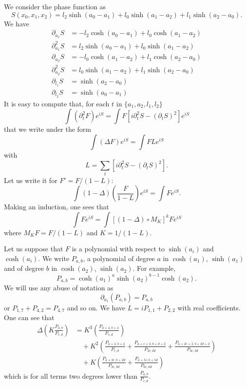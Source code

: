 We consider the phase function as
\begin{equation}
S(x_0,x_1,x_2)=l_2\sinh(a_0-a_1)+l_0\sinh(a_1-a_2)+l_1\sinh(a_2-a_0).
\end{equation}
We have
\begin{subequations}
\begin{align}
\partial_{a_1}S&=-l_2\cosh(a_0-a_1)+l_0\cosh(a_1-a_2)\\
\partial^2_{a_1}S&=l_2\sinh(a_0-a_1)+l_0\sinh(a_1-a_2)\\
\partial_{a_2}S&=-l_0\cosh(a_1-a_2)+l_1\cosh(a_2-a_0)\\
\partial^2_{a_2}S&=l_0\sinh(a_1-a_2)+l_1\sinh(a_2-a_0)\\
\partial_{l_1}S&=\sinh(a_2-a_0)\\
\partial_{l_2}S&=\sinh(a_0-a_1)
\end{align}
\end{subequations}
It is easy to compute that, for each $t$ in $\{a_1, a_2, l_1, l_2\}$
\[ 
  \int (\partial_t^2 F)e^{iS}=\int F[i\partial_t^2S-(\partial_tS)^2]e^{iS}
\]
that we write under the form
\begin{equation}
\int (\Delta F)e^{iS}=\int FLe^{iS}
\end{equation}
with
\[ 
  L=\sum_t [i\partial^2_t S-(\partial_t S)^2].
\]
Let us write it for $F'=F/(1-L)$:
\[ 
  \int (1-\Delta)\left( \frac{F}{1-L} \right)e^{iS}=\int Fe^{iS}.
\]
Making an induction, one sees that 
\begin{equation}
\int Fe^{iS}=\int [(1-\Delta)\circ M_K]^kF e^{iS}
\end{equation}
where $M_K F=F/(1-L)$ and $K=1/(1-L)$.

Let us suppose that $F$ is a polynomial with respect to $\sinh(a_i)$ and $\cosh(a_i)$. We write $P_{a,b}$, a polynomial of degree $a$ in $\cosh(a_1)$, $\sinh(a_1)$ and of degree $b$ in $\cosh(a_2)$, $\sinh(a_2)$. For example,
\[ 
  P_{a,b}=\cosh(a_1)^{a}\sinh(a_2)^{b-1}\cosh(a_2).
\]
We will use any abuse of notation as
\[ 
  \partial_{a_1}(P_{a,b})=P_{a,b}
\]
or $P_{1,7}+P_{4,2}=P_{4,7}$ and so on. We have $L=iP_{1,1}+P_{2,2}$ with real coefficients. One can see that
\begin{equation}
\begin{split}
  \Delta\left( K\frac{P_{a,b}}{P_{c,d}} \right)&=K^3\left( \frac{P_{a+4,b+4}}{P_{c,d}} \right)\\
                                               &\quad+
       K^2\left( \frac{P_{a+2,b+2}}{P_{c,d}} +\frac{P_{a+c+2,b+d+2}}{P_{2c,2d}}+\frac{P_{a+2c+2,b+2d+2}}{P_{3c,3d}} \right)\\
                                               &\quad+
    K\left( \frac{P_{a+2c,b+2d}}{P_{3c,3d}}+\frac{P_{a+5c,b+5d}}{P_{6c,6d}} \right)
\end{split}
\end{equation}
which is for all terms two degrees lower than $\frac{P_{a,b}}{P_{c,d}}$.

